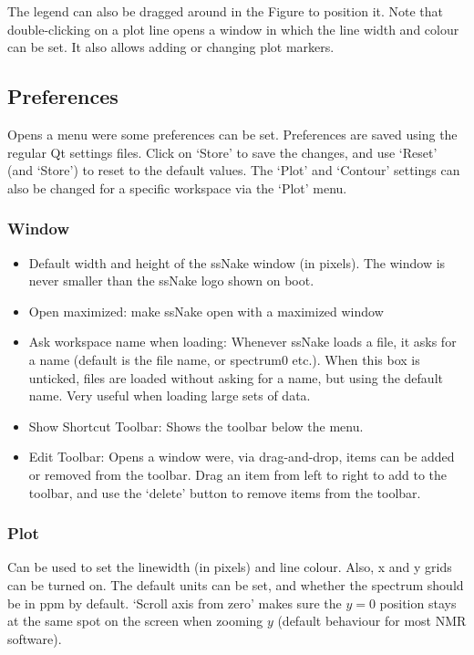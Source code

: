 \documentclass[11pt,a4paper]{article}
\begin{document}
The legend can also be dragged around in the Figure to position it. Note that double-clicking on a plot
line opens a window in which the line width and colour can be set. It also allows adding or changing plot
markers.

\subsection{Preferences}
Opens a menu were some preferences can be set. Preferences are saved using the regular Qt settings files.
Click on `Store' to save the changes, and use `Reset' (and `Store') to reset to the default values. The `Plot'
and `Contour' settings can also be changed for a specific workspace via the `Plot' menu.

\subsubsection{Window}
\begin{itemize}
  \item Default width and height of the ssNake window (in pixels). The window is never smaller than the ssNake
	 logo shown on boot.
  \item Open maximized: make ssNake open with a maximized window
  \item Ask workspace name when loading: Whenever ssNake loads a file, it asks for a name (default is the file name, or spectrum0 etc.). When this box is unticked, files are loaded without asking for a name, but using the default name. Very useful when loading large sets of data.
  \item Show Shortcut Toolbar: Shows the toolbar below the menu.
  \item Edit Toolbar: Opens a window were, via drag-and-drop, items can be added or removed from the toolbar.
	 Drag an item from left to right to add to the toolbar, and use the `delete' button to remove items from the toolbar.
\end{itemize}

\subsubsection{Plot}
Can be used to set the linewidth (in pixels) and line colour. Also, x and y grids can be turned on.
The default units can be set, and whether the spectrum should be in ppm by default. `Scroll axis from zero' makes sure the $y=0$ position stays at the same spot on the screen when zooming $y$ (default behaviour for most NMR software).
\end{document}
